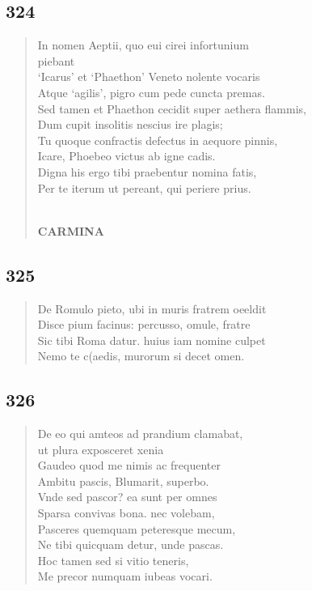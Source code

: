 \documentclass[11pt, a4paper]{report}
\begin{document}
            \subsection*{324}
      \begin{verse}
      In nomen Aeptii, quo eui cirei infortunium \\ piebant \\ ‘Icarus’ et ‘Phaethon’ Veneto nolente vocaris \\ Atque ‘agilis’, pigro cum pede cuncta premas. \\ Sed tamen et Phaethon cecidit super aethera flammis, \\ Dum cupit insolitis nescius ire plagis; \\ Tu quoque confractis defectus in aequore pinnis, \\ Icare, Phoebeo victus ab igne cadis. \\ Digna his ergo tibi praebentur nomina fatis, \\ Per te iterum ut pereant, qui periere prius. \\ 
        ﻿\pagebreak 
     \marginpar{[266]} \begin{center} \textbf{CARMINA} \end{center}
      \end{verse}
  
            \subsection*{325}
      \begin{verse}
      De Romulo pieto, ubi in muris fratrem oeeldit \\ Disce pium facinus: percusso, omule, fratre \\ Sic tibi Roma datur. huius iam nomine culpet \\ Nemo te c(aedis, murorum si decet omen. \\ 
      \end{verse}
  
            \subsection*{326}
      \begin{verse}
      De eo qui amteos ad prandium clamabat, \\ ut plura exposceret xenia \\ Gaudeo quod me nimis ac frequenter \\ Ambitu pascis, Blumarit, superbo. \\ Vnde sed pascor? ea sunt per omnes \\ Sparsa convivas bona. nec volebam, \\ Pasceres quemquam peteresque mecum, \\ Ne tibi quicquam detur, unde pascas. \\ Hoc tamen sed si vitio teneris, \\ Me precor numquam iubeas vocari. \\ 
      \end{verse}
  
\end{document}
